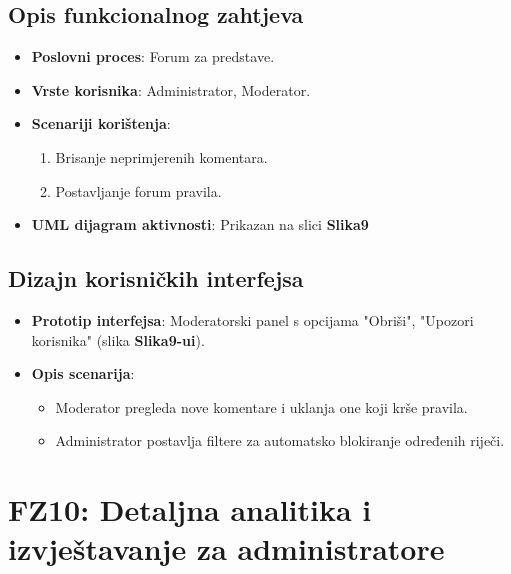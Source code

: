 \subsection{Opis funkcionalnog zahtjeva}  
\begin{itemize}  
    \item \textbf{Poslovni proces}: Forum za predstave.  
    \item \textbf{Vrste korisnika}: Administrator, Moderator.  
    \item \textbf{Scenariji korištenja}:  
        \begin{enumerate}  
            \item Brisanje neprimjerenih komentara.  
            \item Postavljanje forum pravila.  
        \end{enumerate}  
    \item \textbf{UML dijagram aktivnosti}: Prikazan na slici \textbf{Slika9}  
\end{itemize}  

\sloppy  
\subsection{Dizajn korisničkih interfejsa}  
\begin{itemize}  
    \item \textbf{Prototip interfejsa}: Moderatorski panel s opcijama "Obriši", "Upozori korisnika" (slika \textbf{Slika9-ui}).  
    \item \textbf{Opis scenarija}:  
        \begin{itemize}  
            \item Moderator pregleda nove komentare i uklanja one koji krše pravila.  
            \item Administrator postavlja filtere za automatsko blokiranje određenih riječi.  
        \end{itemize}  
\end{itemize}  

\sloppy  
\section{FZ10: Detaljna analitika i izvještavanje za administratore}  

\sloppy  
